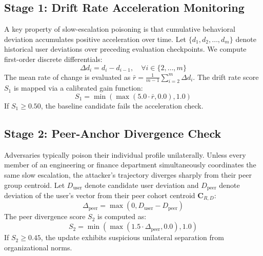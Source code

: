 \documentclass[conference]{IEEEtran}
\begin{document}
\subsection{Stage 1: Drift Rate Acceleration Monitoring}
A key property of slow-escalation poisoning is that cumulative behavioral deviation accumulates positive acceleration over time. Let $\{d_1, d_2, \dots, d_m\}$ denote historical user deviations over preceding evaluation checkpoints. We compute first-order discrete differentials:
\begin{equation}
    \Delta d_i = d_i - d_{i-1}, \quad \forall i \in \{2, \dots, m\}
    \label{eq:p1_diff}
\end{equation}
The mean rate of change is evaluated as $\bar{r} = \frac{1}{m-1} \sum_{i=2}^{m} \Delta d_i$. The drift rate score $S_1$ is mapped via a calibrated gain function:
\begin{equation}
    S_1 = \min\left(\max(5.0 \cdot \bar{r}, 0.0), 1.0\right)
    \label{eq:p1_s1}
\end{equation}
If $S_1 \ge 0.50$, the baseline candidate fails the acceleration check.

\subsection{Stage 2: Peer-Anchor Divergence Check}
Adversaries typically poison their individual profile unilaterally. Unless every member of an engineering or finance department simultaneously coordinates the same slow escalation, the attacker's trajectory diverges sharply from their peer group centroid.
Let $D_{\text{user}}$ denote candidate user deviation and $D_{\text{peer}}$ denote deviation of the user's vector from their peer cohort centroid $\mathbf{C}_{R,D}$:
\begin{equation}
    \Delta_{\text{peer}} = \max\left(0, D_{\text{user}} - D_{\text{peer}}\right)
    \label{eq:p1_delta_peer}
\end{equation}
The peer divergence score $S_2$ is computed as:
\begin{equation}
    S_2 = \min\left(\max(1.5 \cdot \Delta_{\text{peer}}, 0.0), 1.0\right)
    \label{eq:p1_s2}
\end{equation}
If $S_2 \ge 0.45$, the update exhibits suspicious unilateral separation from organizational norms.
\end{document}
